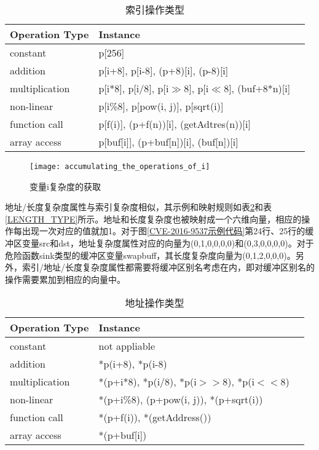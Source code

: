 {\begin{table}[ht]
\begin{center}
\caption{索引操作类型} \label{Index_Type}
\begin{small}
\begin{tabular}{lll}
\hline
{\bf Operation Type } & {\bf Instance}\\
\hline
constant & p[256] \\ \hline
addition & p[i+8], p[i-8], (p+8)[i], (p-8)[i] \\ \hline
multiplication & p[i*8], p[i/8], p[i$\gg$8], p[i$\ll$8], (buf+8*n)[i] \\ \hline
non-linear & p[i\%8], p[pow(i, j)], p[sqrt(i)] \\ \hline
function call & p[f(i)], (p+f(n))[i], (getAdtres(n))[i] \\ \hline
array access & p[buf[i]], (p+buf[n])[i], (buf[n])[i] \\ \hline
\end{tabular}
\end{small}
\end{center}
\end{table}

\begin{figure}[htp]
\centering
\texttt{[image: accumulating\_the\_operations\_of\_i]}
\caption{变量i复杂度的获取}
\label{accumulating_the_operations_of_i}
\end{figure}

地址/长度复杂度属性与索引复杂度相似，其示例和映射规则如表\ref{ADDRESS_TYPE}和表\ref{LENGTH_TYPE}所示。地址和长度复杂度也被映射成一个六维向量，相应的操作每出现一次对应的值就加1。对于图\ref{CVE-2016-9537示例代码}第24行、25行的缓冲区变量src和dst，地址复杂度属性对应的向量为{(0,1,0,0,0,0)}和{(0,3,0,0,0,0)}。对于危险函数sink类型的缓冲区变量swapbuff，其长度复杂度向量为{(0,1,2,0,0,0)}。另外，索引/地址/长度复杂度属性都需要将缓冲区别名考虑在内，即对缓冲区别名的操作需要累加到相应的向量中。

\begin{table}[ht]
\begin{center}
\caption{地址操作类型} \label{ADDRESS_TYPE}
\begin{small}
\begin{tabular}{lll}
\hline
{\bf Operation Type } & {\bf Instance}\\
\hline
constant & not appliable \\ \hline
addition & *p(i+8), *p(i-8) \\ \hline
multiplication & *(p+i*8), *p(i/8), *p(i$>>$8), *p(i$<<8$) \\ \hline
non-linear & *(p+i\%8), (p+pow(i, j)), *(p+sqrt(i)) \\ \hline
function call & *(p+f(i)), *(getAddress()) \\ \hline
array access & *(p+buf[i]) \\ \hline
\end{tabular}
\end{small}
\end{center}
\end{table}


}
